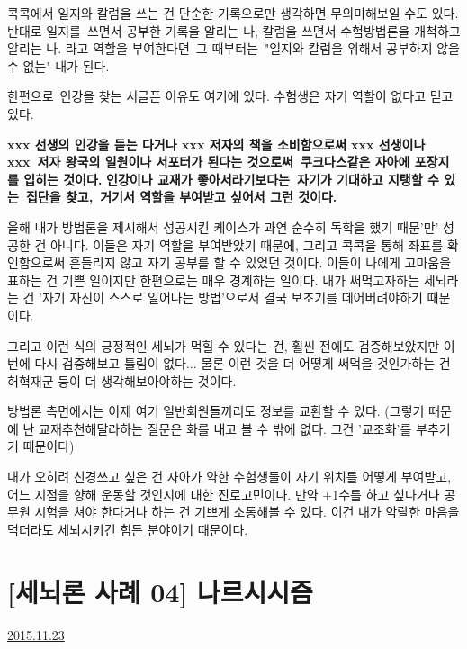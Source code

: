 콕콕에서 일지와 칼럼을 쓰는 건 단순한 기록으로만 생각하면 무의미해보일 수도 있다.
반대로
일지를 쓰면서 공부한 기록을 알리는 나,
칼럼을 쓰면서 수험방법론을 개척하고 알리는 나.
라고 역할을 부여한다면 그 때부터는 "일지와 칼럼을 위해서 공부하지 않을 수 없는" 내가 된다.
\vspace{5mm}

한편으로 인강을 찾는 서글픈 이유도 여기에 있다.
수험생은 자기 역할이 없다고 믿고 있다.
\vspace{5mm}

\textbf{xxx 선생의 인강을 듣는 다거나 xxx 저자의 책을 소비함으로써}
\textbf{xxx 선생이나 xxx 저자 왕국의 일원이나 서포터가 된다는 것으로써 쿠크다스같은 자아에 포장지를 입히는 것이다.}
\textbf{인강이나 교재가 좋아서라기보다는 자기가 기대하고 지탱할 수 있는 집단을 찾고, 거기서 역할을 부여받고 싶어서 그런 것이다.}
\vspace{5mm}

올해 내가 방법론을 제시해서 성공시킨 케이스가 과연 순수히 독학을 했기 때문'만' 성공한 건 아니다.
이들은 자기 역할을 부여받았기 때문에, 그리고 콕콕을 통해 좌표를 확인함으로써 흔들리지 않고 자기 공부를 할 수 있었던 것이다.
이들이 나에게 고마움을 표하는 건 기쁜 일이지만 한편으로는 매우 경계하는 일이다.
내가 써먹고자하는 세뇌라는 건 '자기 자신이 스스로 일어나는 방법'으로서 결국 보조기를 떼어버려야하기 때문이다.
\vspace{5mm}

그리고 이런 식의 긍정적인 세뇌가 먹힐 수 있다는 건, 훨씬 전에도 검증해보았지만 이번에 다시 검증해보고 틀림이 없다...
물론 이런 것을 더 어떻게 써먹을 것인가하는 건 허혁재군 등이 더 생각해보아야하는 것이다.
\vspace{5mm}

방법론 측면에서는 이제 여기 일반회원들끼리도 정보를 교환할 수 있다.
(그렇기 때문에 난 교재추천해달라하는 질문은 화를 내고 볼 수 밖에 없다. 그건 '교조화'를 부추기기 때문이다)
\vspace{5mm}

내가 오히려 신경쓰고 싶은 건 자아가 약한 수험생들이 자기 위치를 어떻게 부여받고, 어느 지점을 향해 운동할 것인지에 대한 진로고민이다.
만약 +1수를 하고 싶다거나 공무원 시험을 쳐야 한다거나 하는 건 기쁘게 소통해볼 수 있다.
이건 내가 악랄한 마음을 먹더라도 세뇌시키긴 힘든 분야이기 때문이다.
\vspace{5mm}









\section{[세뇌론 사례 04] 나르시시즘}
\href{https://www.kockoc.com/Apoc/507013}{2015.11.23}

